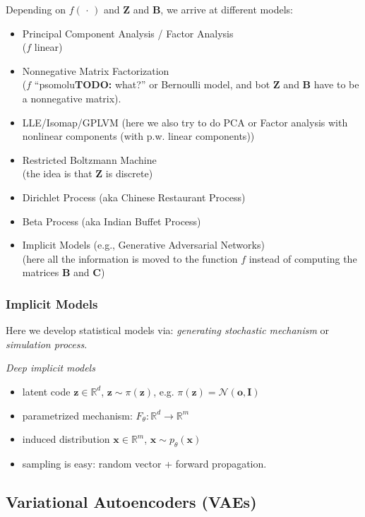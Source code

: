 \documentclass[a2paper,4pt]{extarticle}
\newcommand{\R}{\mathbb{R}}
\newcommand{\cN}{\mathcal{N}}
\newcommand{\mat}[1]{\mathbf{#1}}
\renewcommand{\vec}[1]{\mathbf{#1}}
\newcommand{\vo}{\vec{o}}
\newcommand{\vx}{\vec{x}}
\newcommand{\vz}{\vec{z}}
\newcommand{\MB}{\mat{B}}
\newcommand{\MC}{\mat{C}}
\newcommand{\MI}{\mat{I}}
\newcommand{\MZ}{\mat{Z}}
\newcommand{\argdot}{\,\cdot\,}
\newcommand{\todo}[1]{\textbf{TODO:} #1}
\newcommand{\todo}[1]{%
}
\begin{document}
\begin{landscape}
\begin{multicols*}{7}
Depending on $f(\argdot)$ and $\MZ$ and $\MB$, we arrive at different models:
\begin{itemize}
  \item Principal Component Analysis / Factor Analysis \\($f$ linear)
  \item Nonnegative Matrix Factorization\\ ($f$ ``psomolu\todo{what?}'' or
  Bernoulli model, and bot $\MZ$ and $\MB$ have to be a nonnegative matrix).
  \item LLE/Isomap/GPLVM (here we also try to do PCA or Factor analysis with
  nonlinear components (with p.w. linear components))
  \item Restricted Boltzmann Machine \\(the idea is that $\MZ$ is discrete)
  \item Dirichlet Process (aka Chinese Restaurant Process)\\
  \item Beta Process (aka Indian Buffet Process)
  \item Implicit Models (e.g., Generative Adversarial Networks)\\
  (here all the information is moved to the function $f$ instead of computing
  the matrices $\MB$ and $\MC$)
\end{itemize}

\subsubsection{Implicit Models}

Here we develop statistical models via: \emph{generating stochastic mechanism}
or \emph{simulation process}.

\emph{Deep implicit models}
\begin{itemize}
  \item latent code $\vz\in\R^d$, $\vz\sim\pi(\vz)$, e.g.
  $\pi(\vz)=\cN(\vo,\MI)$
  \item parametrized mechanism: $F_\theta\colon\R^d\to\R^m$
  \item induced distribution $\vx\in\R^m$, $\vx\sim p_\theta(\vx)$
  \item sampling is easy: random vector + forward propagation.
\end{itemize}


\subsection{Variational Autoencoders (VAEs)}


\end{multicols*}
\end{landscape}
\end{document}
